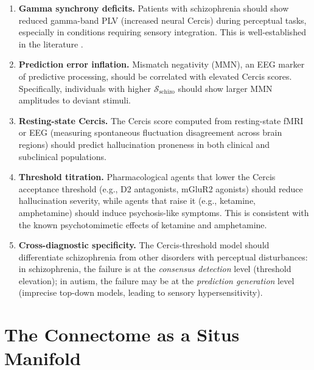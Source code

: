 \documentclass[12pt,a4paper]{article}
\theoremstyle{remark}
\newcommand{\Cercis}{\textsf{Cercis}}
\newcommand{\SchizoScore}{\mathcal{S}_{\text{schizo}}}
\begin{document}
\begin{enumerate}[label=\textbf{P\arabic*}, leftmargin=*]
    \item \textbf{Gamma synchrony deficits.} Patients with schizophrenia should
          show reduced gamma-band PLV (increased neural \Cercis{}) during
          perceptual tasks, especially in conditions requiring sensory integration.
          This is well-established in the literature \cite{uhlhaas2006dysfunctional,
          spencer2003abnormal}.
    \item \textbf{Prediction error inflation.} Mismatch negativity (MMN), an
          EEG marker of predictive processing, should be correlated with
          elevated \Cercis{} scores. Specifically, individuals with higher
          $\SchizoScore$ should show larger MMN amplitudes to deviant stimuli.
    \item \textbf{Resting-state Cercis.} The \Cercis{} score computed from
          resting-state fMRI or EEG (measuring spontaneous fluctuation
          disagreement across brain regions) should predict hallucination
          proneness in both clinical and subclinical populations.
    \item \textbf{Threshold titration.} Pharmacological agents that lower the
          Cercis acceptance threshold (e.g., D2 antagonists, mGluR2 agonists)
          should reduce hallucination severity, while agents that raise it
          (e.g., ketamine, amphetamine) should induce psychosis-like symptoms.
          This is consistent with the known psychotomimetic effects of ketamine
          and amphetamine.
    \item \textbf{Cross-diagnostic specificity.} The \Cercis{}-threshold model
          should differentiate schizophrenia from other disorders with
          perceptual disturbances: in schizophrenia, the failure is at the
          \emph{consensus detection} level (threshold elevation); in autism,
          the failure may be at the \emph{prediction generation} level (imprecise
          top-down models, leading to sensory hypersensitivity).
\end{enumerate}

\section{The Connectome as a Situs Manifold}
\label{sec:connectome}
\end{document}
